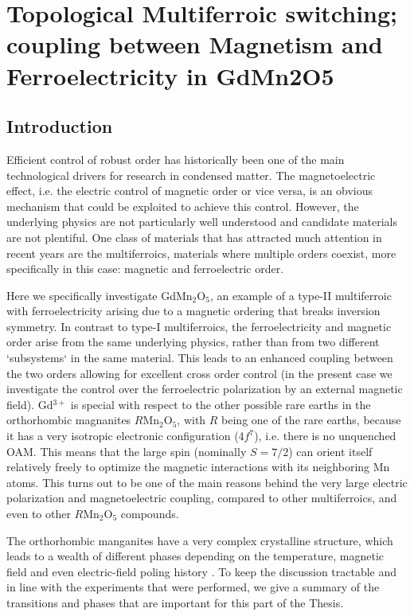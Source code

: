 \chapter{Topological Multiferroic switching; coupling between Magnetism and Ferroelectricity in GdMn2O5}
\section{Introduction}
Efficient control of robust order has historically been one of the main technological drivers for research in condensed matter.
The magnetoelectric effect, i.e. the electric control of magnetic order or vice versa, is an obvious mechanism that could be exploited to achieve this control\cite{Spaldin2019,Khomskii2009,Fiebig2005,Fiebig2016,Cheong2007}.
However, the underlying physics are not particularly well understood and candidate materials are not plentiful.
One class of materials that has attracted much attention in recent years are the multiferroics, materials where multiple orders coexist, more specifically in this case: magnetic and ferroelectric order.

Here we specifically investigate GdMn$_2$O$_5$, an example of a type-II multiferroic\cite{Khomskii2009} with ferroelectricity arising due to a magnetic ordering that breaks inversion symmetry. In contrast to type-I multiferroics, the ferroelectricity and magnetic order arise from the same underlying physics, rather than from two different `subsystems` in the same material. This leads to an enhanced coupling between the two orders allowing for excellent cross order control (in the present case we investigate the control over the ferroelectric polarization by an external magnetic field).
Gd$^{3+}$ is special with respect to the other possible rare earths in the orthorhombic magnanites $R$Mn$_2$O$_5$, with $R$ being one of the rare earths, because it has a very isotropic electronic configuration (4$f^7$), i.e. there is no unquenched OAM. This means that the large spin (nominally $S=7/2$) can orient itself relatively freely to optimize the magnetic interactions with its neighboring Mn atoms.
This turns out to be one of the main reasons behind the very large electric polarization and magnetoelectric coupling, compared to other multiferroics, and even to other $R$Mn$_2$O$_5$ compounds.

The orthorhombic manganites have a very complex crystalline structure, which leads to a wealth of different phases depending on the temperature, magnetic field and even electric-field poling history \cite{Zheng2019}.
To keep the discussion tractable and in line with the experiments that were performed, we give a summary of the transitions and phases that are important for this part of the Thesis.

